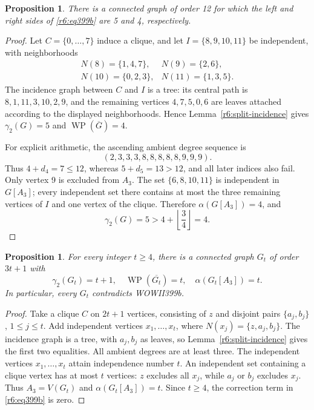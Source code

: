 \documentclass[11pt,a4paper]{article}
\newtheorem{proposition}[theorem]{Proposition}
\theoremstyle{remark}
\begin{document}
\begin{proposition}\label{r6:counter399b}
There is a connected graph of order 12 for which the left and right
sides of \eqref{r6:eq399b} are 5 and 4, respectively.
\end{proposition}
\begin{proof}
Let $C=\{0,\ldots,7\}$ induce a clique, and let
$I=\{8,9,10,11\}$ be independent, with neighborhoods
\[
\begin{array}{ll}
 N(8)=\{1,4,7\}, & N(9)=\{2,6\},\\
 N(10)=\{0,2,3\}, & N(11)=\{1,3,5\}.
\end{array}
\]
The incidence graph between $C$ and $I$ is a tree: its central path
is $8,1,11,3,10,2,9$, and the remaining vertices $4,7,5,0,6$ are
leaves attached according to the displayed neighborhoods. Hence
Lemma~\ref{r6:split-incidence} gives $\gamma_2(G)=5$ and
$\operatorname{WP}(\overline G)=4$.

For explicit arithmetic, the ascending ambient degree sequence is
\[
 (2,3,3,3,8,8,8,8,8,9,9,9).
\]
Thus $4+d_4=7\le12$, whereas $5+d_5=13>12$, and all later indices
also fail. Only vertex 9 is excluded from $A_3$. The set
$\{6,8,10,11\}$ is independent in $G[A_3]$; every independent set
there contains at most the three remaining vertices of $I$ and one
vertex of the clique. Therefore $\alpha(G[A_3])=4$, and
\[
 \gamma_2(G)=5>4+\left\lfloor\frac34\right\rfloor=4.
\]
\end{proof}

\begin{proposition}\label{r6:family399b}
For every integer $t\ge4$, there is a connected graph $G_t$ of order
$3t+1$ with
\[
 \gamma_2(G_t)=t+1,
 \quad \operatorname{WP}(\overline{G_t})=t,
 \quad \alpha(G_t[A_3])=t.
\]
In particular, every $G_t$ contradicts WOWII399b.
\end{proposition}
\begin{proof}
Take a clique $C$ on $2t+1$ vertices, consisting of $z$ and disjoint
pairs $\{a_j,b_j\}$, $1\le j\le t$. Add independent vertices
$x_1,\ldots,x_t$, where $N(x_j)=\{z,a_j,b_j\}$. The incidence graph
is a tree, with $a_j,b_j$ as leaves, so
Lemma~\ref{r6:split-incidence} gives the first two equalities.
All ambient degrees are at least three. The independent vertices
$x_1,\ldots,x_t$ attain independence number $t$. An independent set
containing a clique vertex has at most $t$ vertices: $z$ excludes
all $x_j$, while $a_j$ or $b_j$ excludes $x_j$. Thus $A_3=V(G_t)$
and $\alpha(G_t[A_3])=t$. Since $t\ge4$, the correction term in
\eqref{r6:eq399b} is zero.
\end{proof}
\end{document}
